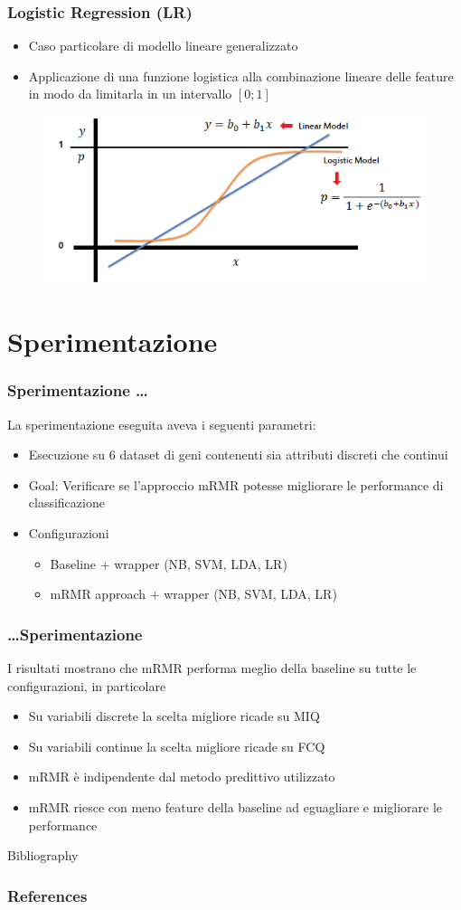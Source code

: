 \documentclass{beamer}
\begin{document}
\begin{frame}
	\frametitle{Logistic Regression (LR)}
	\begin{itemize}
		\item Caso particolare di modello lineare generalizzato
		\item Applicazione di una funzione logistica alla combinazione lineare delle feature in modo da limitarla in un intervallo $[0;1]$ 
	\end{itemize}
	\begin{figure}[htb]
		\includegraphics[width=.9\textwidth]{figure/LogReg.png}
	\end{figure}
\end{frame}

\section{Sperimentazione}
\begin{frame}
	\frametitle{Sperimentazione \dots}
	La sperimentazione eseguita aveva i seguenti parametri:
	\begin{itemize}
		\item Esecuzione su 6 dataset di geni contenenti sia attributi discreti che continui
		\item Goal: Verificare se l'approccio mRMR potesse migliorare le performance di classificazione
		\item Configurazioni
		\begin{itemize}
			\item Baseline + wrapper (NB, SVM, LDA, LR)
			\item mRMR approach + wrapper (NB, SVM, LDA, LR)
		\end{itemize}
	\end{itemize}
\end{frame}

\begin{frame}
	\frametitle{\dots Sperimentazione}
	I risultati mostrano che mRMR performa meglio della baseline su tutte le configurazioni, in particolare
	\begin{itemize}
		\item Su variabili discrete la scelta migliore ricade su MIQ
		\item Su variabili continue la scelta migliore ricade su FCQ
		\item mRMR è indipendente dal metodo predittivo utilizzato
		\item mRMR riesce con meno feature della baseline ad eguagliare e migliorare le performance
	\end{itemize}
\end{frame}

\begin{frame}{Bibliography}
	\frametitle{References}
	
	
\end{frame}
\end{document}
